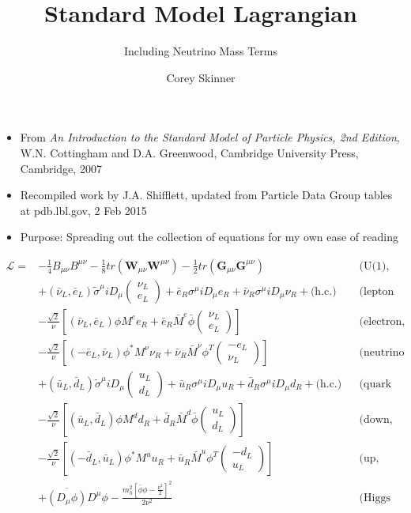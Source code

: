 \documentclass[12pt,a4paper,pagesize=pdftex]{scrartcl}
\title{Standard Model Lagrangian}
\subtitle{Including Neutrino Mass Terms}
\author{Corey Skinner}
\date{}
\newcommand{\icol}[1]{%
  \left(\begin{smallmatrix}#1\end{smallmatrix}\right)%
}
\begin{document}
\pdfpageheight 11in
\pdfpagewidth 8.5in

\maketitle

\begin{itemize}
	\item From \textit{An Introduction to the Standard Model of Particle Physics, 2nd Edition}, W.N. Cottingham and D.A. Greenwood, Cambridge University Press, Cambridge, 2007
	\item Recompiled work by J.A. Shifflett, updated from Particle Data Group tables at pdb.lbl.gov, 2 Feb 2015\
	\item Purpose: Spreading out the collection of equations for my own ease of reading
\end{itemize}

\begin{align*}
	\mathcal{L} = &-\frac{1}{4} B_{\mu\nu}B^{\mu\nu} - \frac{1}{8}tr\left(\mathbf{W}_{\mu\nu}\mathbf{W}^{\mu\nu}\right) - \frac{1}{2}tr\left(\mathbf{G}_{\mu\nu}\mathbf{G}^{\mu\nu}\right) && \text{(U(1), SU(2), and SU(3) gauge terms)} \\
	&+ \left(\bar{\nu}_L,\bar{e}_L\right)\tilde{\sigma}^\mu iD_\mu\icol{\nu_L\\e_L} + \bar{e}_R\sigma^\mu iD_\mu e_R + \bar{\nu}_R\sigma^\mu iD_\mu\nu_R + \text{(h.c.)} && \text{(lepton dynamical term)} \\
	&-\frac{\sqrt{2}}{\nu}\left[\left(\bar{\nu}_L,\bar{e}_L\right)\phi M^ee_R+\bar{e}_R\bar{M}^e\bar{\phi}\icol{\nu_L\\e_L}\right] && \text{(electron, muon, tauon mass term)} \\
	&-\frac{\sqrt{2}}{\nu}\left[\left(-\bar{e}_L,\bar{\nu}_L\right)\phi^{*}M^\nu\nu_R+\bar{\nu}_R\bar{M}^\nu\phi^T\icol{-e_L\\\nu_L}\right] && \text{(neutrino mass term)} \\
	& +\left(\bar{u}_L, \bar{d}_L\right)\tilde{\sigma}^\mu iD_\mu \icol{u_L\\d_L} + \bar{u}_R\sigma^\mu iD_\mu u_R + \bar{d}_R\sigma^\mu iD_\mu d_R + \text{(h.c.)} && \text{(quark dynamical term)} \\
	&- \frac{\sqrt{2}}{\nu}\left[\left(\bar{u}_L,\bar{d}_L\right)\phi M^dd_R+\bar{d}_R\bar{M}^d\bar{\phi}\icol{u_L\\d_L}\right] && \text{(down, strange, bottom mass term)} \\
	&-\frac{\sqrt{2}}{\nu}\left[\left(-\bar{d}_L,\bar{u}_L\right)\phi^{*}M^uu_R+\bar{u}_R\bar{M}^u\phi^T\icol{-d_L\\u_L}\right] && \text{(up, charm, top mass term)} \\
	&+\overline{\left(D_\mu\phi\right)}D^\mu\phi-\frac{m_h^2\left[\bar{\phi}\phi-\frac{\nu^2}{2}\right]^2}{2\nu^2} && \text{(Higgs dynamical and mass term)}
\end{align*}
\end{document}
